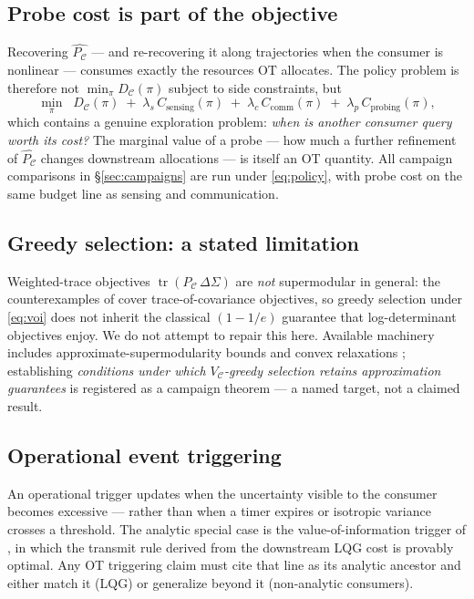 \documentclass{article}
\theoremstyle{definition}
\theoremstyle{remark}
\newcommand{\PC}{P_{\mathcal{C}}}
\newcommand{\tr}{\operatorname{tr}}
\newcommand{\C}{\mathcal{C}}
\newcommand{\Sig}{\Sigma}
\newcommand{\VC}{V_{\mathcal{C}}}
\begin{document}
\subsection{Probe cost is part of the objective}
\label{sec:probecost}

Recovering $\widehat{\PC}$ --- and re-recovering it along trajectories when
the consumer is nonlinear --- consumes exactly the resources OT allocates.
The policy problem is therefore not
$\min_\pi D_\C(\pi)$ subject to side constraints, but
\begin{equation}
\label{eq:policy}
\min_{\pi}\;\; D_\C(\pi)
\;+\;\lambda_s\,C_{\mathrm{sensing}}(\pi)
\;+\;\lambda_c\,C_{\mathrm{comm}}(\pi)
\;+\;\lambda_p\,C_{\mathrm{probing}}(\pi),
\end{equation}
which contains a genuine exploration problem: \emph{when is another consumer
query worth its cost?} The marginal value of a probe --- how much a further
refinement of $\widehat{\PC}$ changes downstream allocations --- is itself an
OT quantity. All campaign comparisons in \S\ref{sec:campaigns} are run under
\eqref{eq:policy}, with probe cost on the same budget line as sensing and
communication.

\subsection{Greedy selection: a stated limitation}
\label{sec:greedy}

Weighted-trace objectives $\tr(\PC\,\Delta\Sig)$ are \emph{not} supermodular
in general: the counterexamples of \citet{jawaidsmith2015}
cover trace-of-covariance objectives, so greedy selection under
\eqref{eq:voi} does not inherit the classical $(1-1/e)$ guarantee that
log-determinant objectives enjoy. We do not attempt to repair this here.
Available machinery includes approximate-supermodularity bounds
\citep{chamon2021} and convex relaxations \citep{joshiboyd2009}; establishing
\emph{conditions under which $\VC$-greedy selection retains approximation
guarantees} is registered as a campaign theorem --- a named target, not a
claimed result.

\subsection{Operational event triggering}
\label{sec:trigger}

An operational trigger updates when the uncertainty visible to the consumer
becomes excessive --- rather than when a timer expires or isotropic variance
crosses a threshold. The analytic special case is the value-of-information
trigger of \citet{soleymani2022,soleymani2023},
in which the transmit rule derived from the downstream LQG cost is provably
optimal. Any OT triggering claim must cite that line as its analytic
ancestor and either match it (LQG) or generalize beyond it (non-analytic
consumers).
\end{document}
